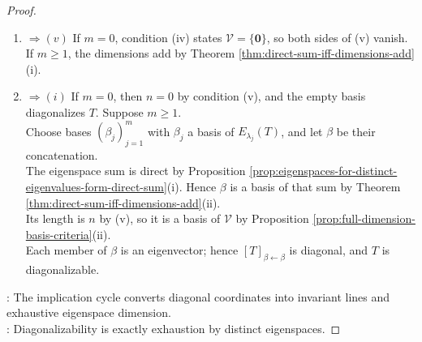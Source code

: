 \begin{theorem}
\begin{proof}
\begin{enumerate}[label=(\roman*)]
Thus every $\mathcal{U}_j$ lies in an eigenspace of $T$, and the listed eigenspaces span $\mathcal{V}$.\\
If $m=0$ and $n\geq1$, then $\mathbf{v}_1$ contradicts $\operatorname{spec}(T)=\emptyset$; hence $m=0\Rightarrow n=0$.\\
If $m=0$, the asserted empty direct sum is $\mathcal{V}=\{\mathbf{0}\}$. If $m\geq1$, the sum is direct by Proposition \ref{prop:eigenspaces-for-distinct-eigenvalues-form-direct-sum}(i).
\item[$(iv)$] $\Rightarrow (v)$ If $m=0$, condition (iv) states $\mathcal{V}=\{\mathbf{0}\}$, so both sides of (v) vanish. If $m\geq1$, the dimensions add by Theorem \ref{thm:direct-sum-iff-dimensions-add}(i).
\item[$(v)$] $\Rightarrow (i)$ If $m=0$, then $n=0$ by condition (v), and the empty basis diagonalizes $T$. Suppose $m\geq1$.\\
Choose bases $(\beta_j)_{j=1}^{m}$ with $\beta_j$ a basis of $E_{\lambda_j}(T)$, and let $\beta$ be their concatenation.\\
The eigenspace sum is direct by Proposition \ref{prop:eigenspaces-for-distinct-eigenvalues-form-direct-sum}(i). Hence $\beta$ is a basis of that sum by Theorem \ref{thm:direct-sum-iff-dimensions-add}(ii).\\
Its length is $n$ by (v), so it is a basis of $\mathcal{V}$ by Proposition \ref{prop:full-dimension-basis-criteria}(ii).\\
Each member of $\beta$ is an eigenvector; hence $[T]_{\beta\leftarrow\beta}$ is diagonal, and $T$ is diagonalizable.
\end{enumerate}
: The implication cycle converts diagonal coordinates into invariant lines and exhaustive eigenspace dimension.\\
: Diagonalizability is exactly exhaustion by distinct eigenspaces.
\end{proof}
\end{theorem}


